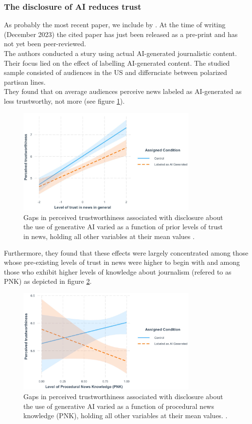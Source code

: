 \documentclass[
  a4paper,  %
  twoside,  %
  bibliography=totoc,
  headsepline,
  cleardoublepage=empty,
  parskip=half,
  draft=false
]{scrbook}
\begin{document}
\subsubsection*{The disclosure of AI reduces trust}
As probably the most recent paper, we include  by \citeauthor{toffTheyCouldJust2023}. At the time of writing (December 2023) the cited paper has just been released as a pre-print and has not yet been peer-reviewed. \\
The authors conducted a stury using actual AI-generated journalistic content. Their focus lied on the effect of labelling AI-generated content. The studied sample consisted of audiences in the US and differnciate between polarized partisan lines. \\
They found that on average audiences perceive news labeled as AI-generated as less trustworthy, not more (see figure \ref{fig:toff-trust}). 
\begin{figure}[h]
  \centering
  \includegraphics[width=0.8\textwidth]{./graphics/toff/Trust in news.png}
  \caption{Gaps in perceived trustworthiness associated with disclosure about the use of generative AI varied as a function of prior levels of trust in news, holding all other variables at their mean values \cite{toffTheyCouldJust2023}.}
  \label{fig:toff-trust}
\end{figure}
Furthermore, they found that these effects were largely concentrated among those whose pre-existing levels of trust in news were higher to begin with and among those who exhibit higher levels of knowledge about journalism (refered to as PNK) as depicted in figure \ref{fig:toff-PNK}.
\begin{figure}[h]
  \centering
  \includegraphics[width=0.8\textwidth]{./graphics/toff/PNK.png}
  \caption{Gaps in perceived trustworthiness associated with disclosure about the use of generative AI varied as a function of procedural news knowledge (PNK), holding all other variables at their mean values. \cite{toffTheyCouldJust2023}.}
  \label{fig:toff-PNK}
\end{figure}
\end{document}
